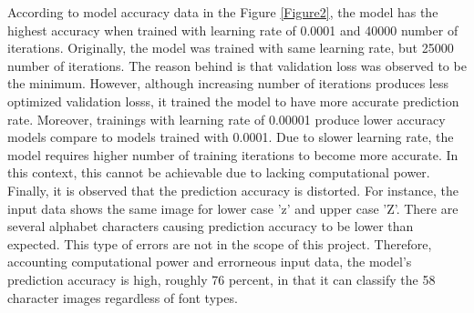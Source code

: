 According to model accuracy data in the Figure \ref{Figure2}, the model has the highest accuracy when trained
with learning rate of 0.0001 and 40000 number of iterations. Originally, the model was trained with same learning rate, but
25000 number of iterations. The reason behind is that validation loss was observed to be the minimum. However, although
increasing number of iterations produces less optimized validation losss, it trained the model to have more accurate
prediction rate.
\newline
\newline
\indent
Moreover, trainings with learning rate of 0.00001 produce lower accuracy models compare to models trained with 0.0001.
Due to slower learning rate, the model requires higher number of training iterations to become more accurate. In this
context, this cannot be achievable due to lacking computational power.
\newline
\newline
\indent
Finally, it is observed that the prediction accuracy is distorted. For instance, the input data shows the same image for
lower case 'z' and upper case 'Z'. There are several alphabet characters causing prediction accuracy to be lower than expected.
This type of errors are not in the scope of this project. Therefore, accounting computational power and errorneous input data,
the model's prediction accuracy is high, roughly 76 percent, in that it can classify the 58 character images regardless of font types.


